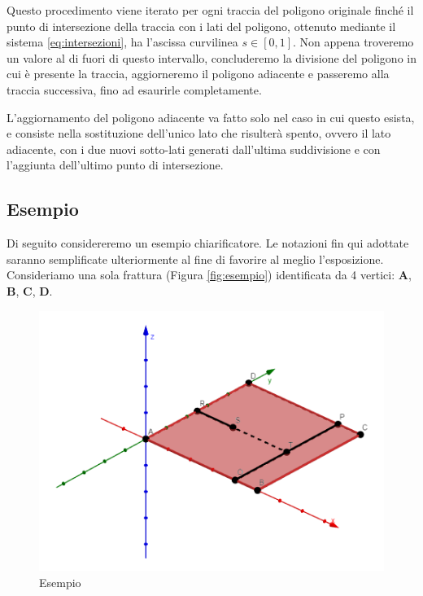\documentclass[a4paper]{article}
\newcommand{\B}{\mathbf}
\begin{document}
Questo procedimento viene iterato per ogni traccia del poligono originale finché il punto di intersezione della traccia con i lati del poligono, ottenuto mediante il sistema \eqref{eq:intersezioni}, ha l'ascissa curvilinea $s \in [0,1]$. Non appena troveremo un valore al di fuori di questo intervallo, concluderemo la divisione del poligono in cui è presente la traccia, aggiorneremo il poligono adiacente e passeremo alla traccia successiva, fino ad esaurirle completamente.

L'aggiornamento del poligono adiacente va fatto solo nel caso in cui questo esista, e consiste nella sostituzione dell'unico lato che risulterà spento, ovvero il lato adiacente, con i due nuovi sotto-lati generati dall'ultima suddivisione e con l'aggiunta dell'ultimo punto di intersezione.




\subsection{Esempio}
Di seguito considereremo un esempio chiarificatore. Le notazioni fin qui adottate saranno semplificate ulteriormente al fine di favorire al meglio l'esposizione. Consideriamo una sola frattura (Figura \ref{fig:esempio}) identificata da 4 vertici: $\B A$, $\B B$, $\B C$, $\B D$. 

\begin{figure}
    \centering
    \includegraphics[width=1 \textwidth]{im3.png}
    \caption{Esempio}
    \label{fig:esempio2}
\end{figure}
\end{document}
